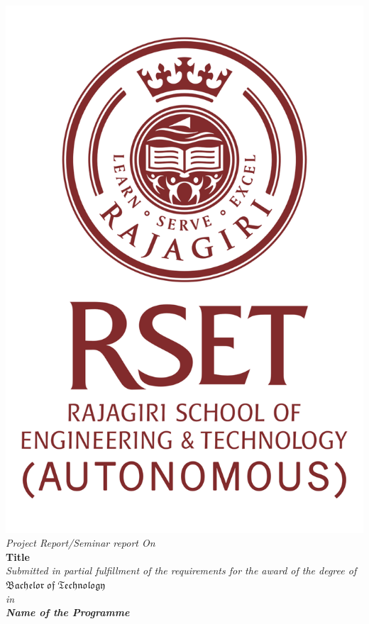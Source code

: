 \begin{center}
	\includegraphics[scale=0.35]{Figures/logo1.png}\\[0.5cm]
	\large \textit{Project Report/Seminar report On}\\[0.5cm]
	\Large \textbf{Title}\\[0.5cm]
	\textit{Submitted in partial fulfillment of the
		requirements for the award of the degree of}\\[0.5cm]
	{\huge {$\mathfrak {Bachelor\; of\; Technology}$}}\\[.5cm]
	\textit{in}\\[.5cm]
	{\Large \bf \itshape{{Name of the Programme}}}\\[1cm]

\end{center}
